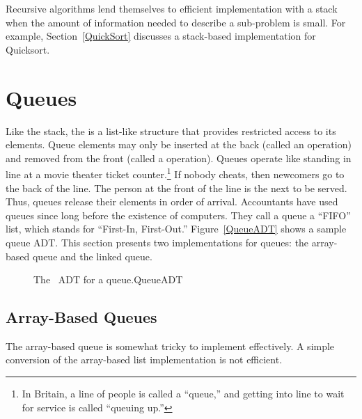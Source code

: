 Recursive algorithms lend themselves to
efficient implementation with a stack when the amount of
information needed to describe a sub-problem is small.
For example, Section~\ref{QuickSort} discusses a
stack-based implementation for Quicksort.

\section{Queues}
\label{Queues}

Like the stack, the  is a list-like structure that
provides restricted access to its elements.
Queue elements may only be inserted at the back (called an
 operation) and removed from the
front (called a  operation).
Queues operate like standing in line at a movie theater ticket
counter.\footnote{In Britain, a line of people is called a
``queue,'' and getting into
line to wait for service is called ``queuing up.''}
If nobody cheats, then newcomers go to the back of the line.
The person at the front of the line is the next to be served.
Thus, queues release their elements in order of arrival.
Accountants have used queues since long before the
existence of computers.
They call a queue a ``FIFO'' list, which stands for ``First-In,
First-Out.''
Figure~\ref{QueueADT} shows a sample queue ADT.
This section presents two implementations for queues:
the array-based queue and the linked queue.

\begin{figure}
\vspace{-\bigskipamount}
{The \Lang\ ADT for a queue.}{QueueADT}
\end{figure}


\subsection{Array-Based Queues}
\label{AQueue}

The array-based queue is somewhat tricky to implement effectively.
A simple conversion of the array-based list implementation is not
efficient.

